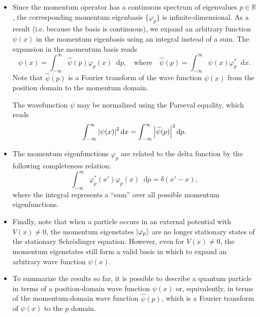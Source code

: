 \documentclass[11pt, a4paper]{article}
\newcommand{\diff}{\mathop{}\!\mathrm{d}} %
\newcommand{\Schro}{Schr\"{o}dinger\xspace}
\newcommand{\F}[1]{\widehat{#1}} %
\begin{document}
\begin{itemize}
    \item Since the momentum operator has a continuous spectrum of eigenvalues $ p \in \mathbb{R} $, the corresponding momentum eigenbasis $ \{\varphi_{p}\} $ is infinite-dimensional. As a result (i.e. because the basis is continuous), we expand an arbitrary function $ \psi(x) $ in the momentum eigenbasis using an integral instead of a sum. The expansion in the momentum basis reads
    \begin{equation*}
        \psi(x) = \int_{-\infty}^{\infty}\F{\psi}(p)\varphi_{p}(x)\diff p, \quad \text{where} \quad \F{\psi}(p) = \int_{-\infty}^{\infty}\psi(x)\varphi_{p}^{*} \diff x.
    \end{equation*}
    Note that $ \F{\psi}(p) $ is a Fourier transform of the wave function $ \psi(x) $ from the position domain to the momentum domain. 

    The wavefunction $ \psi $ may be normalized using the Parseval equality, which reads
    \begin{equation*}
        \int_{-\infty}^{\infty}\abs{\psi(x)}^{2} \diff x = \int_{-\infty}^{\infty}\abs{\F{\psi}(p)}^{2}\diff p.
    \end{equation*}
    
    \item The momentum eigenfunctions $ \varphi_{p} $ are related to the delta function by the following completeness relation:
    \begin{equation*}
        \int_{-\infty}^{\infty} \varphi_{p}^{*}(x')\varphi_{p}(x)\diff p = \delta(x' - x),
    \end{equation*}
    where the integral represents a ``sum'' over all possible momentum eigenfunctions.
    
    \item Finally, note that when a particle occurs in an external potential with $ V(x) \neq 0 $, the momentum eigenstates $ \ket{\varphi_{p}} $ are no longer stationary states of the stationary \Schro equation. However, even for $ V(x) \neq 0 $, the momentum eigenstates still form a valid basis in which to expand an arbitrary wave function $ \psi(x) $.
    
    
    \item To summarize the results so far, it is possible to describe a quantum particle in terms of a position-domain wave function $ \psi(x) $ or, equivalently, in terms of the momentum-domain wave function $ \F{\psi}(p) $, which is a Fourier transform of $ \psi(x) $ to the $ p $ domain. 


\end{itemize}
\end{document}
